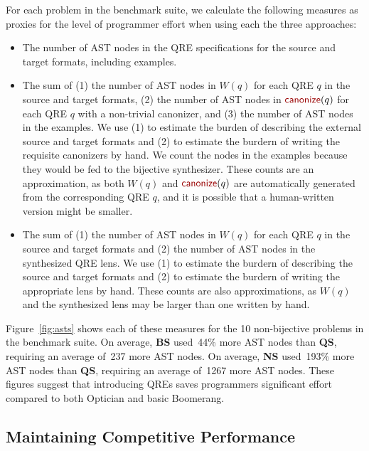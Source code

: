 \documentclass[acmsmall,review,anonymous]{acmart}
\newcommand{\kw}[1]{\textcolor{dkred}{\ensuremath{\mathsf{#1}}}}
\newcommand{\canonize}{\ensuremath{\kw{canonize}}}
\newcommand{\QRESize}{\textbf{QS}}
\newcommand{\canonizeAndSpecSize}{\textbf{BS}}
\newcommand{\LensAndSpecSize}{\textbf{NS}}
\begin{document}
For each problem in the benchmark suite, we calculate the following
measures as proxies for the level of programmer effort when using each
the three approaches:

%
\begin{itemize}
  \item[\QRESize{}:] 
  The number of AST nodes in the QRE specifications for the source and
  target formats, including examples. 
  \item[\canonizeAndSpecSize{}:] 
  The sum of (1) the number of AST nodes in $W(q)$ for each QRE $q$ in the source and target
  formats, (2) the number of AST nodes in $\canonize(q)$ for each QRE $q$ with a
  non-trivial canonizer, and (3) the number of AST nodes in the
  examples.  We use (1) to estimate the burden of describing
  the external source and target formats and (2) to estimate the
  burdern of writing the requisite canonizers
  by hand.  We count the nodes in the examples because they would be
  fed to the bijective synthesizer.  
  These counts are an approximation, as both $W(q)$ and $\canonize(q)$ are
  automatically generated from the corresponding QRE $q$, and it is
  possible that a human-written version might be smaller.
  \item[\LensAndSpecSize{}:] The sum of (1) the number of AST nodes in
  $W(q)$ for each QRE $q$ in the source and target formats and (2) the
  number of AST nodes in the synthesized QRE lens.  We use (1) to
  estimate the burdern of describing the source and target formats
  and (2) to estimate the burdern of writing the appropriate lens by
  hand. These counts are also approximations, as
  $W(q)$ and the synthesized lens may be larger than one written by hand.
\end{itemize}

Figure~\ref{fig:asts} shows each of these measures for the 10
non-bijective problems in the benchmark suite.  On
average, \canonizeAndSpecSize{} used~44\% more AST nodes
than \QRESize{}, requiring an average of~237 more AST nodes. On 
average, \LensAndSpecSize{} used~193\% more AST nodes than \QRESize{}, requiring an
average of~1267 more AST nodes. These figures suggest that introducing QREs saves
programmers significant effort compared to both Optician and basic
Boomerang.

\subsection{Maintaining Competitive Performance}
\end{document}
